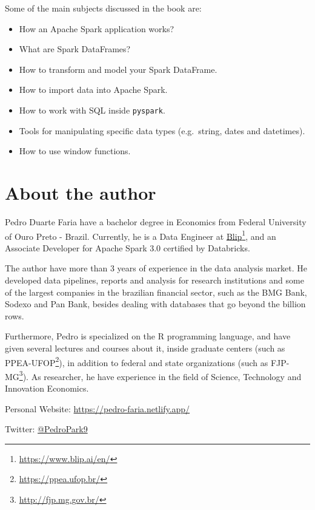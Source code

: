 \documentclass[
  11pt,
  letterpaper,
  DIV=11,
  numbers=noendperiod]{scrreprt}
\providecommand{\tightlist}{%
  \setlength{\itemsep}{0pt}\setlength{\parskip}{0pt}}\usepackage{longtable,booktabs,array}
\begin{document}
Some of the main subjects discussed in the book are:

\begin{itemize}
\tightlist
\item
  How an Apache Spark application works?
\item
  What are Spark DataFrames?
\item
  How to transform and model your Spark DataFrame.
\item
  How to import data into Apache Spark.
\item
  How to work with SQL inside \texttt{pyspark}.
\item
  Tools for manipulating specific data types (e.g.~string, dates and
  datetimes).
\item
  How to use window functions.
\end{itemize}

\section*{About the author}\label{about-the-author}


Pedro Duarte Faria have a bachelor degree in Economics from Federal
University of Ouro Preto - Brazil. Currently, he is a Data Engineer at
\href{https://www.blip.ai/en/}{Blip}\footnote{\url{https://www.blip.ai/en/}},
and an Associate Developer for Apache Spark 3.0 certified by Databricks.

The author have more than 3 years of experience in the data analysis
market. He developed data pipelines, reports and analysis for research
institutions and some of the largest companies in the brazilian
financial sector, such as the BMG Bank, Sodexo and Pan Bank, besides
dealing with databases that go beyond the billion rows.

Furthermore, Pedro is specialized on the R programming language, and
have given several lectures and courses about it, inside graduate
centers (such as PPEA-UFOP\footnote{\url{https://ppea.ufop.br/}}), in
addition to federal and state organizations (such as FJP-MG\footnote{\url{http://fjp.mg.gov.br/}}).
As researcher, he have experience in the field of Science, Technology
and Innovation Economics.

Personal Website: \url{https://pedro-faria.netlify.app/}

Twitter: \href{https://twitter.com/PedroPark9}{@PedroPark9}
\end{document}
